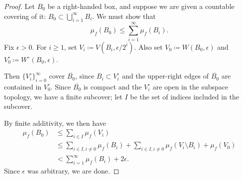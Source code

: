 \begin{proof}
  Let $B_0$ be a right-handed box, and suppose we are given a
  countable covering of it: $B_0 \subset \bigcup_{i=1}^\infty B_i$. We
  must show that
  \[
    \mu_f(B_0) \le \sum_{i=1}^\infty \mu_f(B_i).
  \]
  Fix $\epsilon > 0$. For $i \ge 1$, set
  $V_i \coloneqq V(B_i, \epsilon/2^i)$. Also set
  $V_0 \coloneqq W(B_0,\epsilon)$ and $V_0^\circ \coloneqq W^\circ(B_0,\epsilon)$.

  Then $\{V_i^\circ\}_{i=0}^\infty$ cover $\overline{B_0}$, since
  $B_i \subset V_i^\circ$ and the upper-right edges of
  $\overline{B_0}$ are contained in $V_0^\circ$. Since
  $\overline{B_0}$ is compact and the $V_i^\circ$ are open in the
  subspace topology, we have a finite subcover; let $I$ be the set of
  indices included in the subcover.

  By finite additivity, we then have
  \begin{align*}
    \mu_f(B_0) &\le \sum_{i \in I} \mu_f(V_i)\\
      &\le \sum_{i \in I, i \ne 0} \mu_f(B_i) + \sum_{i \in I, i \ne 0}
        \mu_f(V_i \setminus B_i) + \mu_f(V_0)\\
      &< \sum_{i=1}^\infty \mu_f(B_i) + 2\epsilon.
  \end{align*}
  Since $\epsilon$ was arbitrary, we are done.
\end{proof}

